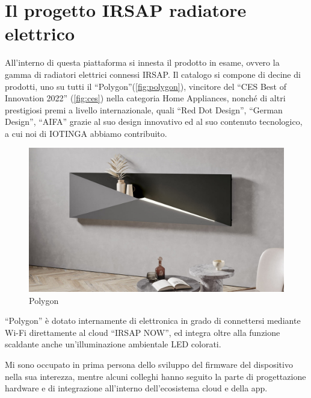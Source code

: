 \documentclass[12pt,a4paper,twoside,titlepage]{book}
\begin{document}
\section{Il progetto IRSAP radiatore elettrico}

All'interno di questa piattaforma si innesta il prodotto in esame,
ovvero la gamma di radiatori elettrici connessi IRSAP. Il catalogo si compone di
decine di prodotti, uno su tutti il ``Polygon''(\autoref{fig:polygon}), vincitore del
``CES Best of Innovation 2022'' (\autoref{fig:ces}) nella categoria Home Appliances,
nonché di altri prestigiosi premi a livello internazionale, quali ``Red Dot Design'',
``German Design'', ``AIFA'' %
grazie al suo design innovativo ed al suo contenuto tecnologico,
a cui noi di IOTINGA abbiamo contribuito.

\begin{figure}[ht]
    \centering
    \includegraphics[width=12cm]{img/polygon.jpeg}
    \caption{Polygon}
    \label{fig:polygon}
\end{figure}

``Polygon'' è dotato internamente di elettronica in grado di connettersi mediante
Wi-Fi direttamente al cloud ``IRSAP NOW'', ed integra oltre alla funzione scaldante
anche un'illuminazione ambientale LED colorati.

Mi sono occupato in prima persona dello sviluppo del firmware del dispositivo nella
sua interezza, mentre alcuni colleghi hanno seguito la parte di progettazione hardware
e di integrazione all'interno dell'ecosistema cloud e della app.
\end{document}
